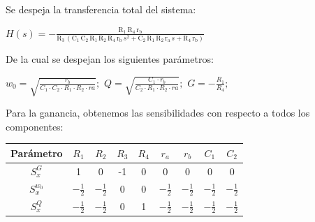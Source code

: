 \documentclass[../tc_tpfinal_main.tex]{subfiles}
\begin{document}
Se despeja la transferencia total del sistema:\par
\begin{center}
$H(s) = -\frac{\mathrm{R_1}\, \mathrm{R_4}\, \mathrm{r_b}}{\mathrm{R_3}\, \left(\mathrm{C_1}\, \mathrm{C_2}\, \mathrm{R_1}\, \mathrm{R_2}\, \mathrm{R_4}\, \mathrm{r_b}\, s^2 + \mathrm{C_2}\, \mathrm{R_1}\, \mathrm{R_2}\, \mathrm{r_a}\, s + \mathrm{R_4}\, \mathrm{r_b}\right)}
$
\end{center}

De la cual se despejan los siguientes parámetros:\par

\begin{center}
$w_0 = \sqrt{\frac{r_b}{C_1\cdot C_2\cdot R_1\cdot R_2\cdot ra}}; $
$Q = \sqrt{\frac{C_1\cdot r_b}{C_2\cdot R_1\cdot R_2\cdot ra}}; $
$G = -\frac{R_1}{R_4}; $ 
\end{center}

Para la ganancia, obtenemos las sensibilidades con respecto a todos los componentes:\par

 	\begin{table}[H] %
				\centering
 				\begin{tabular}{||c c c c c c c c c||} 
 					\hline
				  Parámetro& $R_1$ & $R_2$ & $R_3$ & $R_4$ & $r_a$ & $r_b$&$C_1$&$C_2$\\ [0.5ex] 
 					\hline\hline
					 $S^G_x$& 1 & 0& -1& 0&0&0&0&0\\
					 $S^{w_0}_x$& $- \frac{1}{2}$ &$- \frac{1}{2}$& 0& 0&$- \frac{1}{2}$&$- \frac{1}{2}$&$- \frac{1}{2}$&$- \frac{1}{2}$\\
					 $S^{Q}_x$&$- \frac{1}{2}$ &$- \frac{1}{2}$& 0& 1&$- \frac{1}{2}$&$- \frac{1}{2}$&$- \frac{1}{2}$&$- \frac{1}{2}$\\[1ex] 
					\hline
				\end{tabular}
			\end{table}
			
\end{document}
